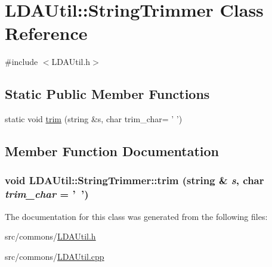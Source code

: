 \hypertarget{class_l_d_a_util_1_1_string_trimmer}{
\section{LDAUtil::StringTrimmer Class Reference}
\label{class_l_d_a_util_1_1_string_trimmer}
}


{\ttfamily \#include $<$LDAUtil.h$>$}

\subsection*{Static Public Member Functions}
\begin{DoxyCompactItemize}
\item 
static void \hyperlink{class_l_d_a_util_1_1_string_trimmer_a1b4b8a1ab39a1697e7aed56639a95ec7}{trim} (string \&s, char trim\_\-char= ' ')
\end{DoxyCompactItemize}


\subsection{Member Function Documentation}
\hypertarget{class_l_d_a_util_1_1_string_trimmer_a1b4b8a1ab39a1697e7aed56639a95ec7}{
\subsubsection[{trim}]{\setlength{\rightskip}{0pt plus 5cm}void LDAUtil::StringTrimmer::trim (string \& {\em s}, \/  char {\em trim\_\-char} = {\ttfamily '~'})}}
\label{class_l_d_a_util_1_1_string_trimmer_a1b4b8a1ab39a1697e7aed56639a95ec7}


The documentation for this class was generated from the following files:\begin{DoxyCompactItemize}
\item 
src/commons/\hyperlink{_l_d_a_util_8h}{LDAUtil.h}\item 
src/commons/\hyperlink{_l_d_a_util_8cpp}{LDAUtil.cpp}\end{DoxyCompactItemize}
